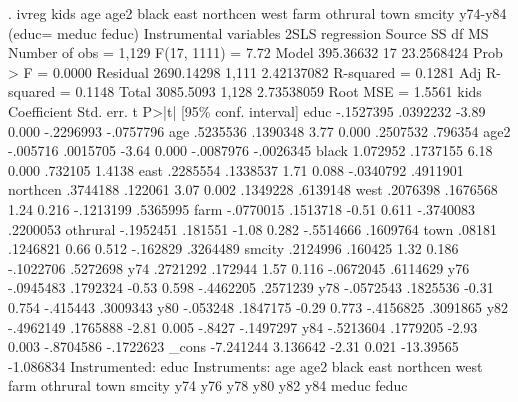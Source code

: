 . ivreg kids age age2 black east northcen west farm othrural town smcity y74-y84 (educ= meduc feduc)
{\smallskip}
Instrumental variables 2SLS regression
{\smallskip}
      Source {\VBAR}       SS           df       MS      Number of obs   =     1,129
   F(17, 1111)     =      7.72
       Model {\VBAR}   395.36632        17  23.2568424   Prob > F        =    0.0000
    Residual {\VBAR}  2690.14298     1,111  2.42137082   R-squared       =    0.1281
   Adj R-squared   =    0.1148
       Total {\VBAR}   3085.5093     1,128  2.73538059   Root MSE        =    1.5561
{\smallskip}
        kids {\VBAR} Coefficient  Std. err.      t    P>|t|     [95\% conf. interval]
        educ {\VBAR}  -.1527395   .0392232    -3.89   0.000    -.2296993   -.0757796
         age {\VBAR}   .5235536   .1390348     3.77   0.000     .2507532     .796354
        age2 {\VBAR}   -.005716   .0015705    -3.64   0.000    -.0087976   -.0026345
       black {\VBAR}   1.072952   .1737155     6.18   0.000      .732105      1.4138
        east {\VBAR}   .2285554   .1338537     1.71   0.088    -.0340792    .4911901
    northcen {\VBAR}   .3744188    .122061     3.07   0.002     .1349228    .6139148
        west {\VBAR}   .2076398   .1676568     1.24   0.216    -.1213199    .5365995
        farm {\VBAR}  -.0770015   .1513718    -0.51   0.611    -.3740083    .2200053
    othrural {\VBAR}  -.1952451    .181551    -1.08   0.282    -.5514666    .1609764
        town {\VBAR}     .08181   .1246821     0.66   0.512     -.162829    .3264489
      smcity {\VBAR}   .2124996    .160425     1.32   0.186    -.1022706    .5272698
         y74 {\VBAR}   .2721292    .172944     1.57   0.116    -.0672045    .6114629
         y76 {\VBAR}  -.0945483   .1792324    -0.53   0.598    -.4462205    .2571239
         y78 {\VBAR}  -.0572543   .1825536    -0.31   0.754     -.415443    .3009343
         y80 {\VBAR}   -.053248   .1847175    -0.29   0.773    -.4156825    .3091865
         y82 {\VBAR}  -.4962149   .1765888    -2.81   0.005       -.8427   -.1497297
         y84 {\VBAR}  -.5213604   .1779205    -2.93   0.003    -.8704586   -.1722623
       _cons {\VBAR}  -7.241244   3.136642    -2.31   0.021    -13.39565   -1.086834
Instrumented: educ
 Instruments: age age2 black east northcen west farm othrural town smcity
              y74 y76 y78 y80 y82 y84 meduc feduc
{\smallskip}
